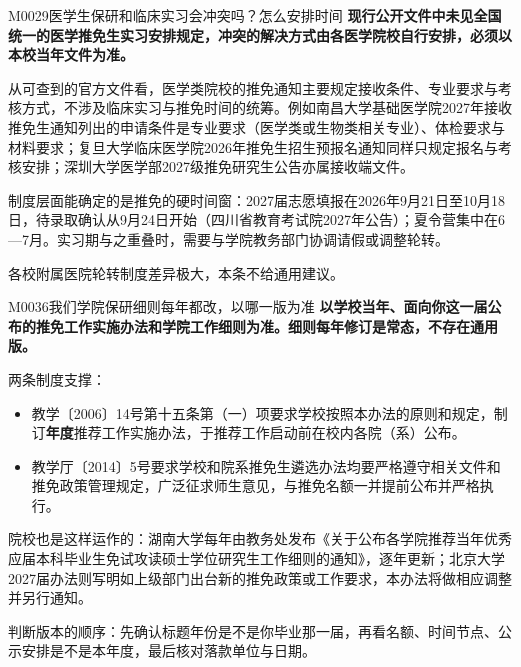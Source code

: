 \begin{qa}{M0029}{医学生保研和临床实习会冲突吗？怎么安排时间}
\textbf{现行公开文件中未见全国统一的医学推免生实习安排规定，冲突的解决方式由各医学院校自行安排，必须以本校当年文件为准。}

从可查到的官方文件看，医学类院校的推免通知主要规定接收条件、专业要求与考核方式，不涉及临床实习与推免时间的统筹。例如南昌大学基础医学院2027年接收推免生通知列出的申请条件是专业要求（医学类或生物类相关专业）、体检要求与材料要求；复旦大学临床医学院2026年推免生招生预报名通知同样只规定报名与考核安排；深圳大学医学部2027级推免研究生公告亦属接收端文件。

制度层面能确定的是推免的硬时间窗：2027届志愿填报在2026年9月21日至10月18日，待录取确认从9月24日开始（四川省教育考试院2027年公告）；夏令营集中在6—7月。实习期与之重叠时，需要与学院教务部门协调请假或调整轮转。

各校附属医院轮转制度差异极大，本条不给通用建议。
\end{qa}

\begin{qa}{M0036}{我们学院保研细则每年都改，以哪一版为准}
\textbf{以学校当年、面向你这一届公布的推免工作实施办法和学院工作细则为准。细则每年修订是常态，不存在通用版。}

两条制度支撑：

\begin{itemize}
  \item 教学〔2006〕14号第十五条第（一）项要求学校按照本办法的原则和规定，制订\textbf{年度}推荐工作实施办法，于推荐工作启动前在校内各院（系）公布。
  \item 教学厅〔2014〕5号要求学校和院系推免生遴选办法均要严格遵守相关文件和推免政策管理规定，广泛征求师生意见，与推免名额一并提前公布并严格执行。
\end{itemize}

院校也是这样运作的：湖南大学每年由教务处发布《关于公布各学院推荐当年优秀应届本科毕业生免试攻读硕士学位研究生工作细则的通知》，逐年更新；北京大学2027届办法则写明如上级部门出台新的推免政策或工作要求，本办法将做相应调整并另行通知。

判断版本的顺序：先确认标题年份是不是你毕业那一届，再看名额、时间节点、公示安排是不是本年度，最后核对落款单位与日期。
\end{qa}

